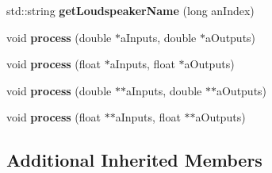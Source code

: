 \begin{DoxyCompactItemize}
\item 
\hypertarget{class_ambisonics_restitution_a3bf0a676a9d45d40e1677ddd382b3d6d}{std\-::string {\bfseries get\-Loudspeaker\-Name} (long an\-Index)}\label{class_ambisonics_restitution_a3bf0a676a9d45d40e1677ddd382b3d6d}

\item 
\hypertarget{class_ambisonics_restitution_ae73551b98fc20ee4b162a2e4af70d83f}{void {\bfseries process} (double $\ast$a\-Inputs, double $\ast$a\-Outputs)}\label{class_ambisonics_restitution_ae73551b98fc20ee4b162a2e4af70d83f}

\item 
\hypertarget{class_ambisonics_restitution_a28ab9d40c20c9a93a5dc1a695ae733ab}{void {\bfseries process} (float $\ast$a\-Inputs, float $\ast$a\-Outputs)}\label{class_ambisonics_restitution_a28ab9d40c20c9a93a5dc1a695ae733ab}

\item 
\hypertarget{class_ambisonics_restitution_acebd4cc20eac6b8e6337fffaaba59466}{void {\bfseries process} (double $\ast$$\ast$a\-Inputs, double $\ast$$\ast$a\-Outputs)}\label{class_ambisonics_restitution_acebd4cc20eac6b8e6337fffaaba59466}

\item 
\hypertarget{class_ambisonics_restitution_a07a0aab6e3a35be52d562413d8f7856c}{void {\bfseries process} (float $\ast$$\ast$a\-Inputs, float $\ast$$\ast$a\-Outputs)}\label{class_ambisonics_restitution_a07a0aab6e3a35be52d562413d8f7856c}

\end{DoxyCompactItemize}
\subsection*{Additional Inherited Members}


